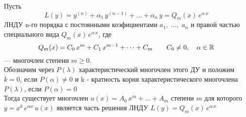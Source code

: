 \begin{Th}
    Пусть 
    \[
        L(y) = y^{(n)} + \alpha_1\,y^{(n-1)} + \dots + \alpha_n\,y = Q_m(x)\,e^{\alpha\,x}
    \]
    ЛНДУ n-го порядка с постоянными коэфициентами $a_1,\; \dots,\; a_n$ и правой частью специального вида $Q_m(x)\,e^{\alpha\,x}$, где 
    \[
        Q_m(x)=C_0\,x^m + C_1\,x^{m-1} + \dots + C_m \qquad C_0 \neq 0, \quad \alpha \in \mathbb{R}
    \] 
    --- многочлен степени $m \geqslant 0$.\\
    
    Обозначим через $P(\lambda)$ характеристический многочлен этого ДУ и положим $k=0$, если $P(\alpha)\neq 0$ и k - кратность корня характеристического многочлена $P(\lambda)$, если $P(\alpha)=0$\\
    
    Тогда существует многочлен $u(x) = A_0\,x^m + \dots + A_m$ степени $m$ для которого\\
    $y = x^k\,e^{\alpha x}\,u(x)$ является часть решения ЛНДУ $L(y) = Q_m(x)\,e^{\alpha\,x}$\\
\end{Th}

